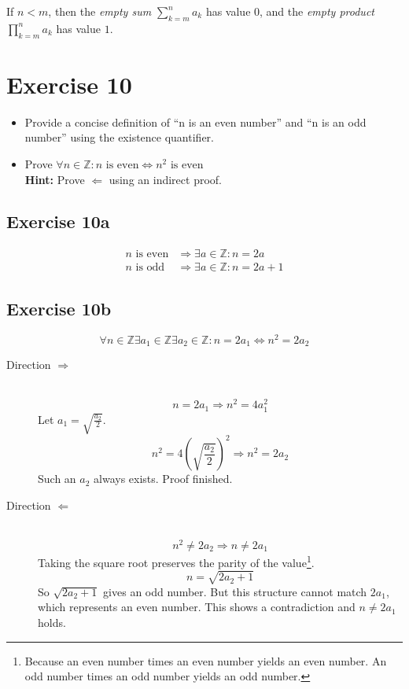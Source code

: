 \documentclass[a4paper]{article}
\theoremstyle{definition}
\begin{document}
If $n < m$, then the \emph{empty sum} $\sum_{k=m}^n a_k$ has value $0$,
and the \emph{empty product} $\prod_{k=m}^n a_k$ has value $1$.

\section{Exercise 10}
\begin{ex} \hfill{}
  \begin{itemize}
    \item Provide a concise definition of \enquote{n is an even number}
          and \enquote{n is an odd number} using the existence quantifier.
    \item Prove $\forall n \in \mathbb Z: n \text{ is even} \Leftrightarrow n^2 \text{ is even}$ \\
          \textbf{Hint:} Prove $\Leftarrow$ using an indirect proof.
  \end{itemize}
\end{ex}

\subsection{Exercise 10a}
\begin{align*}
  n \text{ is even} &\Rightarrow \exists a \in \mathbb Z: n = 2a \\
  n \text{ is odd} &\Rightarrow \exists a \in \mathbb Z: n = 2a + 1
\end{align*}

\subsection{Exercise 10b}
\[
    \forall n \in \mathbb Z \exists a_1 \in \mathbb Z \exists a_2 \in \mathbb Z:
    n = 2a_1 \Leftrightarrow n^2 = 2a_2
\]

\begin{description}
  \item[Direction $\Rightarrow$] \hfill{} \\
    \[ n = 2a_1 \Rightarrow n^2 = 4a_1^2 \]
    Let $a_1 = \sqrt{\frac{a_2}{2}}$.
    \[ n^2 = 4\left(\sqrt{\frac{a_2}{2}}\right)^2 \Rightarrow n^2 = 2a_2 \]
    Such an $a_2$ always exists. Proof finished.
  \item[Direction $\Leftarrow$] \hfill{} \\
    \[ n^2 \neq 2a_2 \Rightarrow n \neq 2a_1 \]
    Taking the square root preserves the parity of the value\footnote{
    Because an even number times an even number yields an even number.
    An odd number times an odd number yields an odd number.}.
    \[ n = \sqrt{2a_2 + 1} \]
    So $\sqrt{2a_2 + 1}$ gives an odd number.
    But this structure cannot match $2a_1$, which represents an even number.
    This shows a contradiction and $n \neq 2a_1$ holds.
\end{description}
\end{document}
